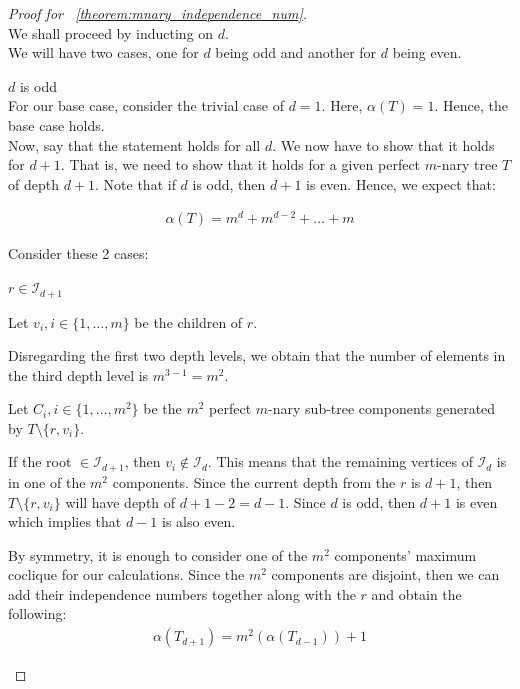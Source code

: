 \documentclass{amsart}
\theoremstyle{definition}
\begin{document}
\begin{proof}[Proof for ~\ref{theorem:mnary_independence_num}]
	$ $ \\
	We shall proceed by inducting on $d$.\\
	We will have two cases, one for $d$ being odd and another for $d$ being even.
	\begin{caseof}
		\item $d$ is odd \\

		For our base case, consider the trivial case of $d = 1$. Here, $\alpha(T) = 1$. Hence, the base case holds. \\

		Now, say that the statement holds for all $d$. We now have to show that it holds for $d+1$. That is, we need to show that it holds for a given perfect $m$-nary tree $T$ of depth $d + 1$. Note that if $d$ is odd, then $d + 1$ is even. Hence, we expect that:


		\begin{align*}
			\alpha(T) = m^d + m^{d - 2} + \ldots + m
		\end{align*}

		Consider these 2 cases:

		\begin{subcaseof}
			\item $r \in \mathcal{I}_{d + 1}$

			Let $v_i, i \in \{1, \dots, m\}$ be the children of $r$.

			Disregarding the first two depth levels, we obtain that the number of elements in the third depth level is $m^{3-1} = m^2$.

			Let $C_i, i \in \{1,\dots, m^2\}$ be the $m^2$ perfect $m$-nary sub-tree components generated by $T \setminus \{r, v_i\}$.

			If the root $\in \mathcal{I}_{d + 1}$, then $v_i \not\in \mathcal{I}_d$. This means that the remaining vertices of $\mathcal{I}_d$ is in one of the $m^2$ components.
			Since the current depth from the $r$ is $d + 1$, then $T \setminus \{r, v_i\}$ will have depth of $d + 1 - 2 = d - 1$. Since $d$ is odd, then $d + 1$ is even which implies that $d - 1$ is also even.

			By symmetry, it is enough to consider one of the $m^2$ components' maximum coclique for our calculations. Since the $m^2$ components are disjoint, then we can add their independence numbers together along with the $r$ and obtain the following:
			\begin{align*}
				\alpha(T_{d + 1}) = m^2(\alpha(T_{d - 1})) + 1
			\end{align*}


\end{subcaseof}
\end{caseof}
\end{proof}
\end{document}
